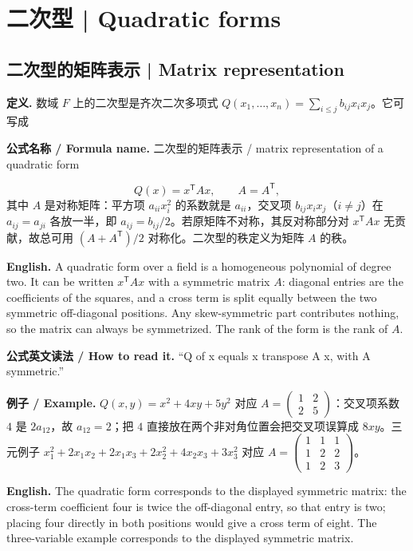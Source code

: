 \documentclass[UTF8,11pt,a4paper]{ctexart}
\newcommand{\EN}[1]{\par\noindent\textbf{English.} #1\par}
\newcommand{\READ}[1]{\par\noindent\textbf{公式英文读法 / How to read it.} #1\par}
\newcommand{\FORMULA}[2]{\par\noindent\textbf{公式名称 / Formula name.} #1 / #2\par}
\newcommand{\EX}[2]{\par\noindent\textbf{例子 / Example.} #1\par\EN{#2}}
\begin{document}
\section{二次型 | Quadratic forms}
\subsection{二次型的矩阵表示 | Matrix representation}
\noindent\textbf{定义.} 数域 $F$ 上的二次型是齐次二次多项式 $Q(x_1,\dots,x_n)=\sum_{i\le j}b_{ij}x_ix_j$。它可写成
\FORMULA{二次型的矩阵表示}{matrix representation of a quadratic form}
\[
Q(x)=x^{\mathsf T}Ax,\qquad A=A^{\mathsf T},
\]
其中 $A$ 是对称矩阵：平方项 $a_{ii}x_i^2$ 的系数就是 $a_{ii}$，交叉项 $b_{ij}x_ix_j$（$i\ne j$）在 $a_{ij}=a_{ji}$ 各放一半，即 $a_{ij}=b_{ij}/2$。若原矩阵不对称，其反对称部分对 $x^{\mathsf T}Ax$ 无贡献，故总可用 $(A+A^{\mathsf T})/2$ 对称化。二次型的秩定义为矩阵 $A$ 的秩。
\EN{A quadratic form over a field is a homogeneous polynomial of degree two. It can be written $x^{\mathsf T}Ax$ with a symmetric matrix $A$: diagonal entries are the coefficients of the squares, and a cross term is split equally between the two symmetric off-diagonal positions. Any skew-symmetric part contributes nothing, so the matrix can always be symmetrized. The rank of the form is the rank of $A$.}
\READ{``Q of x equals x transpose A x, with A symmetric.''}
\EX{$Q(x,y)=x^2+4xy+5y^2$ 对应 $A=\begin{pmatrix}1&2\\2&5\end{pmatrix}$：交叉项系数 $4$ 是 $2a_{12}$，故 $a_{12}=2$；把 $4$ 直接放在两个非对角位置会把交叉项误算成 $8xy$。三元例子 $x_1^2+2x_1x_2+2x_1x_3+2x_2^2+4x_2x_3+3x_3^2$ 对应 $A=\begin{pmatrix}1&1&1\\1&2&2\\1&2&3\end{pmatrix}$。}{The quadratic form corresponds to the displayed symmetric matrix: the cross-term coefficient four is twice the off-diagonal entry, so that entry is two; placing four directly in both positions would give a cross term of eight. The three-variable example corresponds to the displayed symmetric matrix.}
\end{document}

